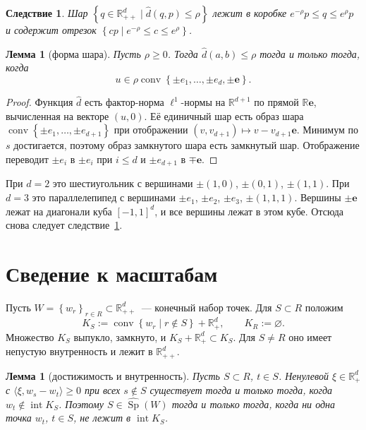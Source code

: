\documentclass[a4paper,11pt]{article}
\theoremstyle{plain}
\newtheorem{lemma}[theorem]{Лемма}
\newtheorem{corollary}[theorem]{Следствие}
\theoremstyle{definition}
\theoremstyle{remark}
\newcommand{\R}{\mathbb{R}}
\newcommand{\set}[1]{\left\{ #1 \right\}}
\newcommand{\ip}[2]{\langle #1, #2\rangle} %
\newcommand{\Rpp}[1][2]{\R^{#1}_{++}} %
\newcommand{\Rp}[1][2]{\R^{#1}_{+}}   %
\DeclareMathOperator{\conv}{conv}
\DeclareMathOperator{\Sp}{Sp}
\DeclareMathOperator{\interior}{int}
\newcommand{\dd}{\widehat d}
\begin{document}
\begin{corollary}\label{cor:ball}
    Шар $\set{q\in\Rpp[d]\mid\dd(q,p)\le\rho}$ лежит в коробке $e^{-\rho}p\le q\le e^{\rho}p$ и содержит отрезок $\set{cp\mid e^{-\rho}\le c\le e^{\rho}}$.
\end{corollary}

\begin{lemma}[форма шара]\label{lem:shape}
    Пусть $\rho\ge0$. Тогда $\dd(a,b)\le\rho$ тогда и только тогда, когда
    \[
        u\in\rho\conv\set{\pm e_1,\dots,\pm e_d,\pm\mathbf e}.
    \]
\end{lemma}

\begin{proof}
    Функция $\dd$ есть фактор-норма $\ell^1$-нормы на $\R^{d+1}$ по прямой $\R\mathbf e$, вычисленная на векторе $(u,0)$. Её единичный шар есть образ шара $\conv\set{\pm e_1,\dots,\pm e_{d+1}}$ при отображении $(v,v_{d+1})\mapsto v-v_{d+1}\mathbf e$. Минимум по $s$ достигается, поэтому образ замкнутого шара есть замкнутый шар. Отображение переводит $\pm e_i$ в $\pm e_i$ при $i\le d$ и $\pm e_{d+1}$ в $\mp\mathbf e$.
\end{proof}

При $d=2$ это шестиугольник с вершинами $\pm(1,0)$, $\pm(0,1)$, $\pm(1,1)$. При $d=3$ это параллелепипед с вершинами $\pm e_1$, $\pm e_2$, $\pm e_3$, $\pm(1,1,1)$. Вершины $\pm\mathbf e$ лежат на диагонали куба $[-1,1]^d$, и все вершины лежат в этом кубе. Отсюда снова следует следствие~\ref{cor:ball}.

\section{Сведение к масштабам}

Пусть $W=\set{w_r}_{r\in R}\subset\Rpp[d]$~--- конечный набор точек. Для $S\subset R$ положим
\[
    K_S:=\conv\set{w_r\mid r\notin S}+\Rp[d],\qquad K_R:=\varnothing.
\]
Множество $K_S$ выпукло, замкнуто, и $K_S+\Rp[d]\subset K_S$. Для $S\ne R$ оно имеет непустую внутренность и лежит в $\Rpp[d]$.

\begin{lemma}[достижимость и внутренность]\label{lem:interior}
    Пусть $S\subset R$, $t\in S$. Ненулевой $\xi\in\Rp[d]$ с $\ip{\xi}{w_s-w_t}\ge0$ при всех $s\notin S$ существует тогда и только тогда, когда $w_t\notin\interior K_S$. Поэтому $S\in\widehat{\Sp}(W)$ тогда и только тогда, когда ни одна точка $w_t$, $t\in S$, не лежит в $\interior K_S$.
\end{lemma}
\end{document}
